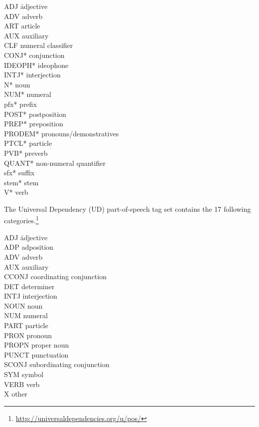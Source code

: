 \documentclass[a4paper, 11pt]{book}
\begin{document}
\begin{multicols}{2}
	\begin{tabbing}
	ADJ \hspace{2cm} \= adjective \\
	ADV \> adverb \\
	ART \> article \\
	AUX \> auxiliary \\
	CLF \> numeral classifier \\
	CONJ* \> conjunction \\
	IDEOPH* \> ideophone \\
	INTJ* \> interjection \\
	N* \> noun \\
	NUM* \> numeral \\
	pfx* \> prefix \\
	POST* \> postposition \\
	PREP* \> preposition \\
	PRODEM* \> pronouns/demonstratives \\
	PTCL* \> particle \\
	PVB* \> preverb \\
	QUANT* \> non-numeral quantifier \\
	sfx* \> suffix \\
	stem* \> stem \\
	V* \> verb \\
	\end{tabbing}
\end{multicols}

\noindent The Universal Dependency (UD) part-of-speech tag set contains the 17 following categories.\footnote{\url{http://universaldependencies.org/u/pos/}}

\begin{multicols}{2}
	\begin{tabbing}
ADJ \hspace{2cm} \=  adjective \\
ADP \> adposition \\
ADV \> adverb \\
AUX \> auxiliary \\
CCONJ \> coordinating conjunction \\
DET \> determiner \\
INTJ \> interjection \\
NOUN \> noun \\
NUM \> numeral \\
PART \> particle \\
PRON \> pronoun \\
PROPN \> proper noun \\
PUNCT \> punctuation \\
SCONJ \> subordinating conjunction \\
SYM \> symbol \\
VERB \> verb \\
X \> other \\
	\end{tabbing}
\end{multicols}
\end{document}

